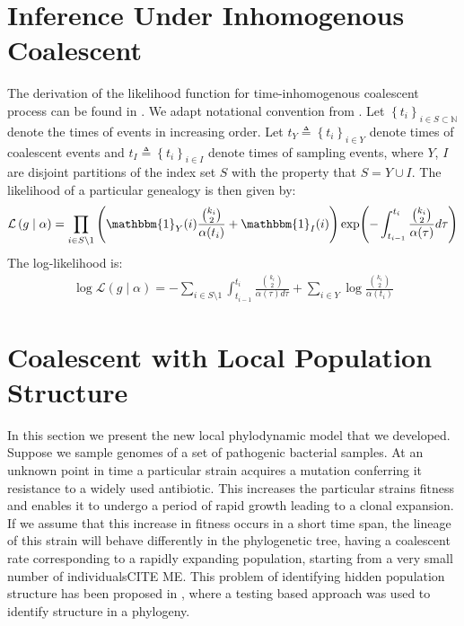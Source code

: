 \documentclass{report}
\newcommand{\N}{\mathbb{N}}
\newcommand{\CITEMISSING}{\colorbox{BurntOrange}{CITE ME}}
\theoremstyle{definition}
\begin{document}
\section{Inference Under Inhomogenous Coalescent}
The derivation of the likelihood function for time-inhomogenous coalescent process can be found in \cite{drummond_estimating_2002}. We adapt notational convention from \cite{drummond_estimating_2002}.
Let $\left\{t_i\right\}_{i\in S\subset \N}$ denote the times of events in increasing order. Let $t_Y\triangleq \left\{t_i\right\}_{i\in Y}$ denote times of coalescent events and $t_I\triangleq \left\{t_i\right\}_{i\in I}$ denote times of sampling events, where $Y$, $I$ are disjoint partitions of the index set $S$ with the property that $S = Y\cup I$.
The likelihood of a particular genealogy is then given by:
\begin{gather}
\mathcal{L}\left(g\mid \alpha\right) 
= \prod_{i\in S\setminus 1}\left(\mathbbm{1}_Y(i)\frac{\binom{k_{i}}{2}}{\alpha(t_i)}+\mathbbm{1}_I(i)\right)
\exp(-\int_{t_{i-1}}^{t_i}\frac{\binom{k_{i}}{2}}{\alpha(\tau)}d\tau)
\end{gather}
The log-likelihood is:
\begin{gather}
\log\mathcal{L}\left(g\mid \alpha\right) 
= -\sum_{i\in S\setminus 1}{\int_{t_{i-1}}^{t_i}{\frac{\binom{k_{i}}{2}}{\alpha(\tau)d\tau}}} + \sum_{i\in Y}{\log\frac{\binom{k_{i}}{2}}{\alpha(t_i)}}
\end{gather}
\section{Coalescent with Local Population Structure}
In this section we present the new local phylodynamic model that we developed.
Suppose we sample genomes of a set of pathogenic bacterial samples. 
At an unknown point in time a particular strain acquires a mutation conferring it resistance to a widely used antibiotic. This increases the particular strains fitness and enables it to undergo a period of rapid growth leading to a clonal expansion. If we assume that this increase in fitness occurs in a short time span, the lineage of this strain will behave differently in the phylogenetic tree, having a coalescent rate corresponding to a rapidly expanding population, starting from a very small number of individuals\CITEMISSING. This problem of identifying hidden population structure has been proposed in \cite{volz_identification_nodate}, where a testing based approach was used to identify structure in a phylogeny.\\
\end{document}
